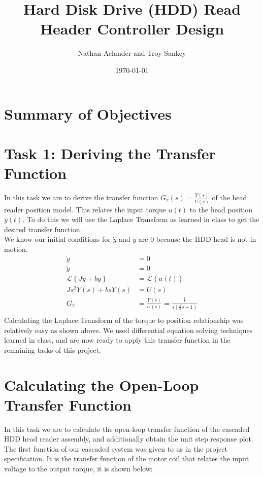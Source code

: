 \documentclass{article}
\title{Hard Disk Drive (HDD) Read Header Controller Design}
\date{\today}
\author{Nathan Aclander and Troy Sankey}
\begin{document}
\maketitle
\newpage

\section*{Summary of Objectives}

\section*{Task 1: Deriving the Transfer Function}
	In this task we are to derive the transfer function $G_2(s) = 
	\frac{Y(s)}{U(s)}$ of the head reader position model. This relates the
	input torque $u(t)$ to the head position $y(t)$. To do this we will use
	the Laplace Transform as learned in class to get the desired transfer 
	function. \\
	We know our initial conditions for $\dot{y}$ and $\ddot{y}$ are $0$ because
	the HDD head is not in motion.
	\begin{align*}
		\dot{y} &= 0 \\
		\ddot{y} &= 0 \\
		\mathcal{L}\left\{ J\ddot{y} + b \dot{y}\right\} &= \mathcal{L}\left\{
		u(t)\right\} \\
		Js^2 Y(s) + bsY(s) &= U(s) \\
		G_2 &= \frac{Y(s)}{U(s)} = \frac{\frac{1}{b}}{s(\frac{J}{b}s + 1)}  \\
	\end{align*}
	Calculating the Laplace Transform of the torque to position relationship
	was relatively easy as shown above. We used differential equation solving
	techniques learned in class, and are now ready to apply this transfer
	function in the remaining tasks of this project.

\section*{Calculating the Open-Loop Transfer Function}
	In this task we are to calculate the open-loop transfer function of the 
	cascaded HDD head reader assembly, and additionally obtain the unit step
	response plot. 
	The first function of our cascaded system was given to us in the project
	specification. It is the transfer function of the motor coil that relates
	the input voltage to the output torque, it is shown below: \\
\end{document}
